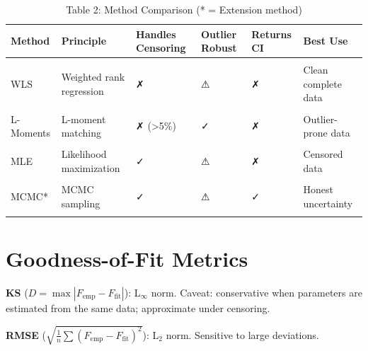 \documentclass[
]{article}
\begin{document}
\begin{longtable}[t]{llllll}
\caption{\label{tab:table-2-methods}Table 2: Method Comparison (* = Extension method)}\\
\toprule
Method & Principle & Handles Censoring & Outlier Robust & Returns CI & Best Use\\
\midrule
\cellcolor{gray!10}{OLS} & \cellcolor{gray!10}{Rank regression} & \cellcolor{gray!10}{✗} & \cellcolor{gray!10}{✗} & \cellcolor{gray!10}{✗} & \cellcolor{gray!10}{Quick visual}\\
WLS & Weighted rank regression & ✗ & ⚠ & ✗ & Clean complete data\\
\cellcolor{gray!10}{MOM} & \cellcolor{gray!10}{Moment matching} & \cellcolor{gray!10}{✗} & \cellcolor{gray!10}{✗} & \cellcolor{gray!10}{✗} & \cellcolor{gray!10}{Complete data}\\
L-Moments & L-moment matching & ✗ (>5\%) & ✓ & ✗ & Outlier-prone data\\
\cellcolor{gray!10}{EPF} & \cellcolor{gray!10}{Energy pattern factor} & \cellcolor{gray!10}{✗} & \cellcolor{gray!10}{✗} & \cellcolor{gray!10}{✗} & \cellcolor{gray!10}{Wind energy}\\
\addlinespace
MLE & Likelihood maximization & ✓ & ⚠ & ✗ & Censored data\\
\cellcolor{gray!10}{MAP} & \cellcolor{gray!10}{Posterior mode} & \cellcolor{gray!10}{✓} & \cellcolor{gray!10}{⚠} & \cellcolor{gray!10}{✗} & \cellcolor{gray!10}{Small n + prior}\\
MCMC* & MCMC sampling & ✓ & ⚠ & ✓ & Honest uncertainty\\
\cellcolor{gray!10}{Percentile} & \cellcolor{gray!10}{Two-quantile} & \cellcolor{gray!10}{✗} & \cellcolor{gray!10}{✗} & \cellcolor{gray!10}{✗} & \cellcolor{gray!10}{Teaching}\\
\bottomrule
\end{longtable}
\endgroup{}

\section{Goodness-of-Fit Metrics}\label{goodness-of-fit-metrics}

\textbf{KS} (\(D = \max|F_{\text{emp}} - F_{\text{fit}}|\)):
L\(_\infty\) norm. Caveat: conservative when parameters are estimated
from the same data; approximate under censoring.

\textbf{RMSE}
(\(\sqrt{\frac{1}{n}\sum(F_{\text{emp}} - F_{\text{fit}})^2}\)): L\(_2\)
norm. Sensitive to large deviations.
\end{document}
